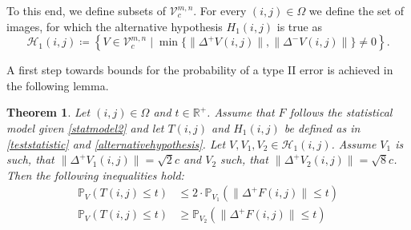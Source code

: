 \documentclass[a4paper,12pt]{article}
\newcommand{\norm}[1]{\lVert#1\rVert}
\theoremstyle{plain}
\newtheorem{theorem}{Theorem}[section]
\theoremstyle{definition}
\begin{document}
To this end, we define subsets of $\mathcal{V}_c^{m, n}$. For every $(i, j) \in \Omega$ we define the set of images, for which the alternative hypothesis $H_1(i, j)$ is true as
\begin{equation}
	\mathcal{H}_1(i, j) \coloneqq \left\{ V \in \mathcal{V}_c^{m, n} \mid \min \{ \norm{\Delta^+ V(i, j)}, \norm{\Delta^- V(i, j)} \} \neq 0 \right\}.
\end{equation}

A first step towards bounds for the probability of a type II error is achieved in the following lemma.

\begin{theorem}\label{thm: typeIIboundssimulation}
	Let $(i, j) \in \Omega$ and $t \in \mathbb{R}^+$. Assume that $F$ follows the statistical model given \eqref{statmodel2} and let $T(i, j)$ and $H_1(i, j)$ be defined as in \eqref{teststatistic} and \eqref{alternativehypothesis}. Let $V, V_1, V_2 \in \mathcal{H}_1(i, j)$. Assume $V_1$ is such, that $\norm{\Delta^+ V_1(i, j)} = \sqrt{2} c$ and $V_2$ such, that $\norm{\Delta^+ V_2(i, j)} = \sqrt{8} c$. Then the following inequalities hold:
	\begin{align}
		\mathbb{P}_V\left( T(i, j) \leq t \right) &\leq 2 \cdot \mathbb{P}_{V_1}\left( \norm{\Delta^+ F(i, j)} \leq t \right) \label{eq: typeIIupperboundsimulation} \\
		\mathbb{P}_V\left( T(i, j) \leq t \right) &\geq \mathbb{P}_{V_2}\left( \norm{\Delta^+ F(i, j)} \leq t \right) \label{eq: typeIIlowerboundsimulation}
	\end{align}
\end{theorem}
\end{document}
